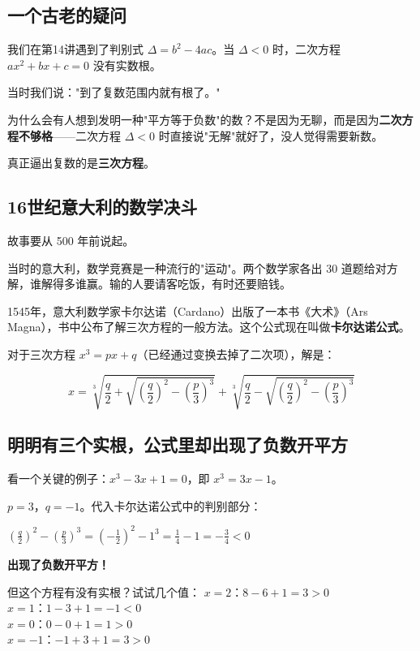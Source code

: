 

\subsection*{一个古老的疑问}

我们在第14讲遇到了判别式 $\Delta = b^2 - 4ac$。当 $\Delta < 0$ 时，二次方程 $ax^2+bx+c=0$ 没有实数根。

当时我们说："到了复数范围内就有根了。"

为什么会有人想到发明一种"平方等于负数"的数？不是因为无聊，而是因为\textbf{二次方程不够格}——二次方程 $\Delta<0$ 时直接说"无解"就好了，没人觉得需要新数。

真正逼出复数的是\textbf{三次方程}。

\subsection*{16世纪意大利的数学决斗}

故事要从 500 年前说起。

当时的意大利，数学竞赛是一种流行的"运动"。两个数学家各出 30 道题给对方解，谁解得多谁赢。输的人要请客吃饭，有时还要赔钱。

1545年，意大利数学家卡尔达诺（Cardano）出版了一本书《大术》（Ars Magna），书中公布了解三次方程的一般方法。这个公式现在叫做\textbf{卡尔达诺公式}。

对于三次方程 $x^3 = px + q$（已经通过变换去掉了二次项），解是：

\[
x = \sqrt[3]{\frac{q}{2} + \sqrt{\left(\frac{q}{2}\right)^2 - \left(\frac{p}{3}\right)^3}} +
     \sqrt[3]{\frac{q}{2} - \sqrt{\left(\frac{q}{2}\right)^2 - \left(\frac{p}{3}\right)^3}}
\]

\subsection*{明明有三个实根，公式里却出现了负数开平方}

看一个关键的例子：$x^3 - 3x + 1 = 0$，即 $x^3 = 3x - 1$。

$p=3$，$q=-1$。代入卡尔达诺公式中的判别部分：

$\left(\frac{q}{2}\right)^2 - \left(\frac{p}{3}\right)^3 = \left(-\frac12\right)^2 - 1^3 = \frac14 - 1 = -\frac34 < 0$

\textbf{出现了负数开平方！}

但这个方程有没有实根？试试几个值：
$x=2$：$8-6+1=3>0$\\
$x=1$：$1-3+1=-1<0$\\
$x=0$：$0-0+1=1>0$\\
$x=-1$：$-1+3+1=3>0$


